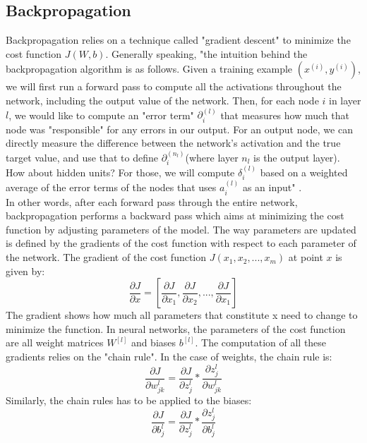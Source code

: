 \subsection{Backpropagation}

\setlength{\marginparwidth}{3cm}\leavevmode {}Backpropagation relies on a technique called "gradient descent" to minimize the cost function $J(W, b)$. Generally speaking, "the intuition behind the backpropagation algorithm is as follows. Given a training example $(x^{(i)}, y^{(i)})$, we will first run a forward pass to compute all the activations throughout the network, including the output value of the network. Then, for each node $i$ in layer $l$, we would like to compute an "error term" $\partial^{(l)}_{i}$ that measures how much that node was "responsible" for any errors in our output. For an output node, we can directly measure the difference between the network’s activation and the true target value, and use that to define $\partial^{(n_{l})}_{i}$(where layer $n_{l}$ is the output layer). How about hidden units? For those, we will compute $\delta^{(l)}_{i}$ based on a weighted average of the error terms of the nodes that uses $a^{(l)}_{i}$ as an input" \cite{24}.\\
In other words, after each forward pass through the entire network, backpropagation performs a backward pass which aims at minimizing the cost function by adjusting parameters of the model. The way parameters are updated is defined by the gradients of the cost function with respect to each parameter of the network. The gradient of the cost function $J(x_{1}, x_{2}, ..., x_{m})$ at point $x$ is given by:
\begin{equation}
\frac{\partial J}{\partial x} = [\frac{\partial J}{\partial x_{1}}, \frac{\partial J}{\partial x_{2}}, ..., \frac{\partial J}{\partial x_{1}}]
\end{equation}
The gradient shows how much all parameters that constitute x need to change to minimize the function. In neural networks, the parameters of the cost function are all weight matrices $W^{[l]}$ and biases $b^{[l]}$. The computation of all these gradients relies on the "chain rule". In the case of weights, the chain rule is:
\begin{equation}
\frac{\partial J}{\partial w_{jk}^{l}} = \frac{\partial J}{\partial z_{j}^{l}} * \frac{\partial z_{j}^{l}}{\partial w_{jk}^{l}}
\end{equation}
Similarly, the chain rules has to be applied to the biases:
\begin{equation}
\frac{\partial J}{\partial b_{j}^{l}} = \frac{\partial J}{\partial z_{j}^{l}} * \frac{\partial z_{j}^{l}}{\partial b_{j}^{l}}
\end{equation}
